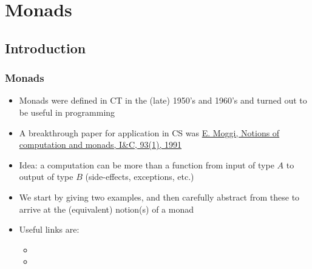 \documentclass[handout]{beamer}
\title[INF223 presentations]{}
\begin{document}
\section{Monads}
\subsection{Introduction}
 
\frame
  {   
    \frametitle{Monads}\label{Mon5:Intro}

 \begin{itemize}[<+->]
\item Monads were defined in CT in the (late) 1950's and 1960's and  
turned out to be useful in programming
\item A breakthrough paper for application in CS was 
\href{https://person.dibris.unige.it/moggi-eugenio/ftp/ic91.pdf}{\color{blue}E. Moggi, Notions of computation and monads, I\&C, 93(1), 1991}
\item Idea: a computation can be more than a function from input 
of type $A$ to output of type $B$ (side-effects, exceptions, etc.)
\item We start by giving two examples, and then carefully abstract from 
these to arrive at the (equivalent) notion(s) of a monad
\item Useful links are:
 \begin{itemize}
    \item {}
    \item {}
 \end{itemize}
 \end{itemize}

 }
\end{document}
